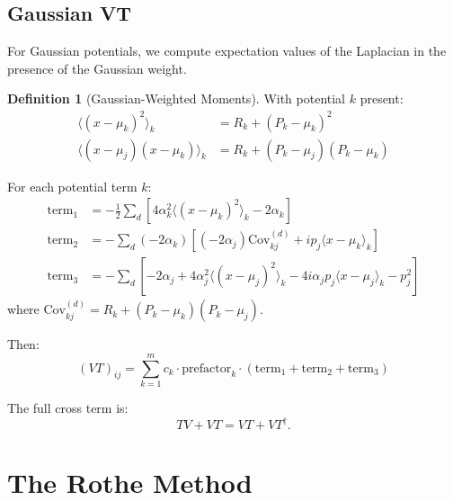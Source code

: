 \documentclass[11pt,a4paper]{article}
\newcommand{\half}{\tfrac{1}{2}}
\theoremstyle{definition}
\newtheorem{definition}{Definition}
\begin{document}
\subsection{Gaussian VT}

For Gaussian potentials, we compute expectation values of the Laplacian in the presence of the Gaussian weight.

\begin{definition}[Gaussian-Weighted Moments]
With potential $k$ present:
\begin{align}
\langle (x - \mu_k)^2 \rangle_k &= R_k + (P_k - \mu_k)^2 \\
\langle (x - \mu_j)(x - \mu_k) \rangle_k &= R_k + (P_k - \mu_j)(P_k - \mu_k)
\end{align}
\end{definition}

\begin{tcolorbox}[colback=purple!5,colframe=purple!50!black,title=Gaussian $VT$ Matrix]
For each potential term $k$:
\begin{align}
\text{term}_1 &= -\half \sum_d \left[ 4\alpha_k^2 \langle(x-\mu_k)^2\rangle_k - 2\alpha_k \right] \\
\text{term}_2 &= -\sum_d (-2\alpha_k)\left[ (-2\alpha_j) \text{Cov}_{kj}^{(d)} + i p_j \langle x-\mu_k \rangle_k \right] \\
\text{term}_3 &= -\sum_d \left[ -2\alpha_j + 4\alpha_j^2 \langle(x-\mu_j)^2\rangle_k - 4i\alpha_j p_j \langle x-\mu_j\rangle_k - p_j^2 \right]
\end{align}
where $\text{Cov}_{kj}^{(d)} = R_k + (P_k - \mu_k)(P_k - \mu_j)$.

Then:
\begin{equation}
(VT)_{ij} = \sum_{k=1}^{m} c_k \cdot \text{prefactor}_k \cdot (\text{term}_1 + \text{term}_2 + \text{term}_3)
\end{equation}
\end{tcolorbox}

The full cross term is:
\begin{equation}
TV + VT = VT + VT^\dagger.
\end{equation}

\section{The Rothe Method}
\end{document}
